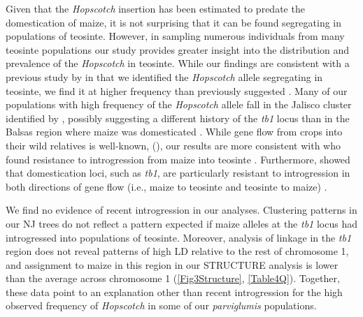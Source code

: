\documentclass[11pt]{article}
\begin{document}
\begin{linenumbers}
\begin{flushleft}
Given that the \emph{Hopscotch} insertion has been estimated to predate the domestication of maize, it is not surprising that it can be found segregating in populations of teosinte. However, in sampling numerous individuals from many teosinte populations our study provides greater insight into the distribution and prevalence of the \emph{Hopscotch} in teosinte. While our findings are consistent with a previous study by \citet{Studer2011} in that we identified the \emph{Hopscotch} allele segregating in teosinte, we find it at higher frequency than previously suggested \citep{Studer2011}. Many of our populations with high frequency of the \emph{Hopscotch} allele fall in the Jalisco cluster identified by \citet{Fukunaga2005}, possibly suggesting a different history of the \emph{tb1} locus than in the Balsas region where maize was domesticated \citep{Matsuoka2002}. While gene flow from crops into their wild relatives is well-known, (\citep{Ellstrand1999, Zhang2009, Thurber2010, Baack2008, Hubner2012, Wilkes1977, VanHeerwaarden2011, Barrett1983}), our results are more consistent with \citet{Hufford2013} who found resistance to introgression from maize into teosinte \citep{Hufford2013}. Furthermore, \citet{Hufford2013} showed that domestication loci, such as \emph{tb1}, are particularly resistant to introgression in both directions of gene flow (i.e., maize to teosinte and teosinte to maize) \citep{Hufford2013}. 

We find no evidence of recent introgression in our analyses. Clustering patterns in our NJ trees do not reflect a pattern expected if maize alleles at the \emph{tb1} locus had introgressed into populations of teosinte.  Moreover, analysis of linkage in the \emph{tb1} region does not reveal patterns of high LD relative to the rest of chromosome 1, and assignment to maize in this region in our STRUCTURE analysis is lower than the average across chromosome 1 (\ref{Fig3Structure}, \ref{Table4Q}). Together, these data point to an explanation other than recent introgression for the high observed frequency of \emph{Hopscotch} in some of  our \emph{parviglumis} populations.


\end{flushleft}
\end{linenumbers}
\end{document}
